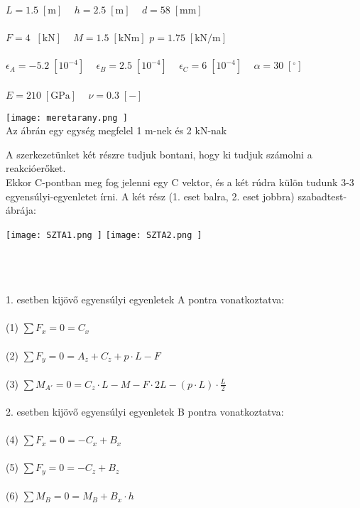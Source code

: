 \documentclass[10pt, a4paper]{article}
\newcommand{\adat}{\begin{trivlist}\item[\hskip \labelsep {\bfseries 
			{Adatok:}}]\end{trivlist}}
\newcommand{\egy}{\begin{trivlist}\item[\hskip \labelsep {\bfseries 
			{1. Feladat:}}]\end{trivlist}}
\newcommand{\knm}{\;\mathrm{\left[kNm\right]}}
\newcommand{\kn}{\;\mathrm{\left[kN\right]}}
\newcommand{\meter}{\mathrm{\left[m\right]}}
\newcommand{\pknm}{\mathrm{\left[kN/m\right]}}
\newcommand{\mm}{\mathrm{\left[mm\right]}}
\newcommand{\minegy}{\mathrm{\left[10^{-4}\right]}}
\newcommand{\dimnel}{\mathrm{\left[-\right]}}
\newcommand{\fok}{\mathrm{\left[^\circ\right]}}
\newcommand{\gpa}{\mathrm{\left[GPa\right]}}
\begin{document}
	
	\adat
	$ L = 1.5\;\meter \;\;\;$ $ h = 2.5\;\meter \;\;\;$ $ d = 58\;\mm$\\\\
	$ F = 4\;\kn \;\;\; $ $ M = 1.5\knm $ $ p = 1.75\;\pknm \;\;\;$\\\\
	$ \epsilon_A = -5.2\;\minegy \;\;\;$ $ \epsilon_B = 2.5\;\minegy \;\;\;$ $ \epsilon_C = 6\;\minegy \;\;\;$ $ \alpha = 30\;\fok \;\;\;$\\\\
	$ E = 210\;\gpa \;\;\;$ $ \nu = 0.3\;\dimnel \;\;\;$
	\setcounter{page}{1}
	\egy
	\begin{center}
		\texttt{[image:  meretarany.png ]}\\
		Az ábrán egy egység megfelel 1 m-nek és 2 kN-nak
	\end{center}
	A szerkezetünket két részre tudjuk bontani, hogy ki tudjuk számolni a reakcióerőket.\\
	Ekkor C-pontban meg fog jelenni egy C vektor, és a két rúdra külön tudunk 3-3 egyensúlyi-egyenletet írni.
	A két rész (1. eset balra, 2. eset jobbra) szabadtest-ábrája:
	\begin{center}
		\texttt{[image:  SZTA1.png ]}
		\texttt{[image:  SZTA2.png ]}
	\end{center}
	$ $\\\\\\\\
	1. esetben kijövő egyensúlyi egyenletek A pontra vonatkoztatva:\\\\
	\tabto{50pt}(1) $\sum{F_x} = 0 = C_x$\\\\
	\tabto{50pt}(2) $\sum{F_y} = 0 = A_z + C_z + p \cdot L - F$\\\\
	\tabto{50pt}(3) $\sum{M_{A'}} = 0 = C_z \cdot L - M - F \cdot 2L - (p \cdot L) \cdot \frac{L}{2}$\\\\
	2. esetben kijövő egyensúlyi egyenletek B pontra vonatkoztatva:\\\\
	\tabto{50pt}(4) $\sum{F_x} = 0 = -C_x + B_x$\\\\
	\tabto{50pt}(5) $\sum{F_y} = 0 = -C_z + B_z$\\\\
	\tabto{50pt}(6) $\sum{M_B} = 0 = M_B + B_x \cdot h$\\\\
\end{document}
